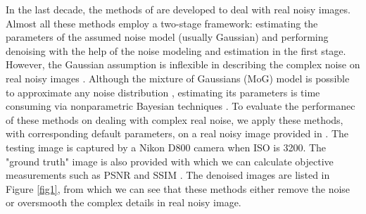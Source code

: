 \documentclass[10pt,twocolumn,letterpaper]{article}
\begin{document}
In the last decade, the methods of \cite{fullyblind,rabie2005robust,Liu2008,almapg,noiseclinic,Zhu_2016_CVPR,crosschannel2016} are developed to deal with real noisy images. Almost all these methods employ a two-stage framework: estimating the parameters of the assumed noise model (usually Gaussian) and performing denoising with the help of the noise modeling and estimation in the first stage. However, the Gaussian assumption is inflexible in describing the complex noise on real noisy images \cite{Liu2008}. Although the mixture of Gaussians (MoG) model is possible to approximate any noise distribution \cite{Bishop}, estimating its parameters is time consuming via nonparametric Bayesian techniques \cite{Zhu_2016_CVPR}. To evaluate the performanec of these methods on dealing with complex real noise, we apply these methods, with corresponding default parameters, on a real noisy image provided in \cite{crosschannel2016}. The testing image is captured by a Nikon D800 camera when ISO is 3200. The "ground truth" image is also provided with which we can calculate objective measurements such as PSNR and SSIM \cite{ssim}. The denoised images are listed in Figure \ref{fig1}, from which we can see that these methods either remove the noise or oversmooth the complex details in real noisy image. 
\end{document}
